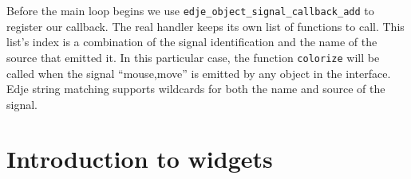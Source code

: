 \documentclass[12pt,a4paper,english]{book}
\begin{document}
Before the main loop begins we use \texttt{edje{\_}object{\_}signal{\_}callback{\_}add} to
register our callback. The real handler keeps its own list of functions to call.
This list's index is a combination of the signal identification and the name of
the source that emitted it. In this particular case, the function \texttt{colorize}
will be called when the signal ``mouse,move'' is emitted by any object in the
interface. Edje string matching supports wildcards for both the name and source
of the signal.



\hypertarget{introduction-to-widgets}{}
\chapter{Introduction to widgets}
\label{introduction-to-widgets}
\end{document}

